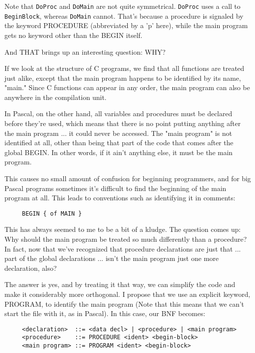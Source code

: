 Note  that  {\tt DoProc}  and {\tt DoMain} are not quite symmetrical. {\tt DoProc} uses a call to {\tt BeginBlock}, whereas {\tt DoMain} cannot. That's because a procedure  is signaled by the keyword PROCEDURE (abbreviated by a 'p' here), while the main program gets no  keyword  other  than the BEGIN itself.

And  THAT  brings up an interesting question: WHY?

If  we  look  at the structure of C programs, we  find  that  all functions are treated just  alike, except  that the main program happens to be identified by its name, "main."  Since  C functions can appear in any order, the main program can also be anywhere in the compilation unit.

In Pascal, on the other hand, all variables  and  procedures must be declared before they're  used, which  means  that there is no point putting anything after the  main program ... it could never be accessed. The "main program" is not identified at  all, other than  being that part of the code that  comes  after  the  global BEGIN. In other words, if it ain't anything else, it must be the main program.

This  causes  no  small  amount   of   confusion   for  beginning programmers, and for big Pascal programs sometimes it's difficult to  find the beginning of the main program at all. This leads to conventions such as identifying it in comments:

\begin{verbatim}
     BEGIN { of MAIN }
\end{verbatim}

This  has  always  seemed  to  me to be a bit of a kludge. The question comes up:    Why  should  the main program be treated so much  differently  than  a  procedure?   In fact, now that  we've recognized that  procedure declarations are just that ... part of the global declarations ... isn't  the main program just one more declaration, also?

The answer is yes, and by  treating  it that way, we can simplify the code and make  it  considerably  more  orthogonal. I propose that  we  use  an explicit keyword, PROGRAM, to identify the main program (Note that this  means  that we can't start the file with it, as in Pascal). In this case, our BNF becomes:

\begin{verbatim}
     <declaration>  ::= <data decl> | <procedure> | <main program>
     <procedure>    ::= PROCEDURE <ident> <begin-block>
     <main program> ::= PROGRAM <ident> <begin-block>
\end{verbatim}

